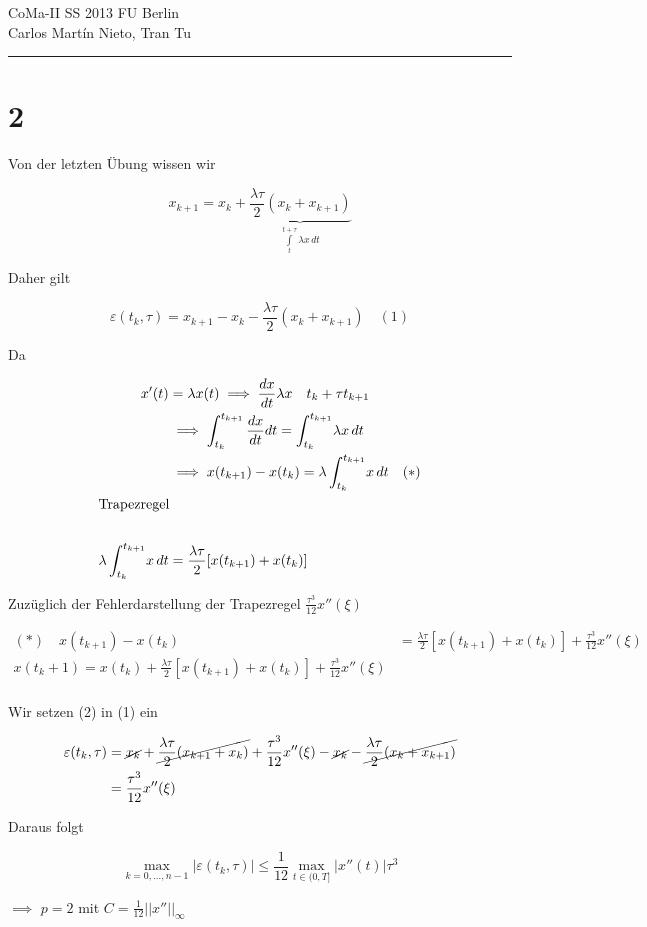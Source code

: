 \documentclass[ngerman,a4paper]{scrartcl}
\begin{document}
{\sffamily
  \hfill
  CoMa-II SS 2013\hfill
  FU Berlin\\[8pt]
  \hfill Carlos Martín Nieto, Tran Tu\hrule \bigskip
}

\section*{2}

Von der letzten Übung wissen wir

\[
x_{k+1} = x_k + \underbrace{\frac{\lambda \tau}{2} (x_k + x_{k+1})}_{\int\limits^{t+\tau}_t \lambda x \, dt}
\]

Daher gilt

\[
\varepsilon(t_k, \tau) = x_{k+1} - x_k - \frac{\lambda\tau}{2} (x_k + x_{k+1}) \quad (1)
\]

Da


\begin{align*}
  x'(t) &= \lambda x(t) \implies \frac{dx}{dt} \lambda x \quad t_k +
  \tau t_{k+1}\\
  &\implies \int^{t_{k+1}}_{t_k} \frac{dx}{dt} dt = \int^{t_{k+1}}_{t_k} \! \lambda x\, dt\\
  &\implies x(t_{k+1}) - x(t_k) = \lambda \int^{t_{k+1}}_{t_k} \! x\, dt \quad (*)\\
  \intertext{Trapezregel}\\
  \lambda \int^{t_{k+1}}_{t_k} \! x\, dt &= \frac{\lambda\tau}{2} [x(t_{k+1}) + x(t_k)]
\end{align*}

Zuzüglich der Fehlerdarstellung der Trapezregel $\frac{\tau^3}{12}x''(\xi)$


\begin{align*}
  (*) \quad x(t_{k+1}) - x(t_k) &= \frac{\lambda\tau}{2}[x(t_{k+1}) +
  x(t_k)] + \frac{\tau^3}{12} x''(\xi)\\
  x(t_k + 1) = x(t_k) + \frac{\lambda\tau}{2} [x(t_{k+1}) +
  x(t_k)] + \frac{\tau^3}{12} x''(\xi)\\
\end{align*}

Wir setzen (2) in (1) ein

\begin{align*}
  \varepsilon(t_k, \tau) &= \cancel{x_k} + \cancel{\frac{\lambda\tau}{2} (x_{k+1} + x_k)}
  + \frac{\tau^3}{12} x''(\xi) - \cancel{x_k} - \cancel{\frac{\lambda\tau}{2} (x_{k} + x_{k+1})}\\
  &= \frac{\tau^3}{12} x''(\xi)
\end{align*}

Daraus folgt

\[
\max_{k=0,\dots,n-1} |\varepsilon(t_k, \tau)| \leq \frac{1}{12} \max_{t \in (0, T]} | x''(t)| \tau^3
\]

$\implies$ $p=2$ mit $C = \frac{1}{12} ||x''||_\infty$
\end{document}
